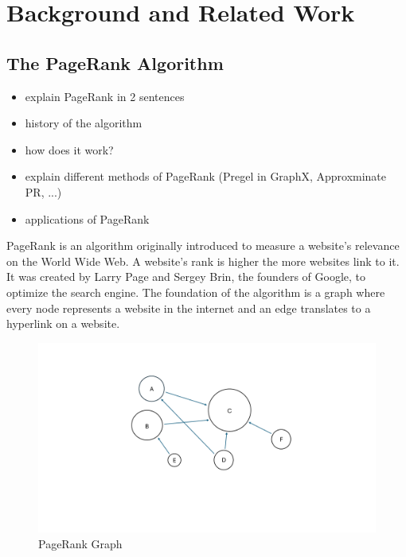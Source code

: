 
\section{Background and Related Work}
\subsection{The PageRank Algorithm}

\begin{itemize}
  \item explain PageRank in 2 sentences
  \item history of the algorithm
  \item how does it work? 
  \item explain different methods of PageRank (Pregel in GraphX, Approxminate PR, ...)
  \item applications of PageRank
\end{itemize}

PageRank is an algorithm originally introduced to measure a website's relevance on the World Wide Web. A website's rank is higher the more websites link to it. It was created by Larry Page and Sergey Brin, the founders of Google, to optimize the search engine.
The foundation of the algorithm is a graph where every node represents a website in the internet and an edge translates to a hyperlink on a website.
\begin{figure}[ht]
    \centering
    \includegraphics[width=0.7\linewidth]{images/PageRank Graph.pdf}
    \caption{PageRank Graph}
    \label{fig:pagerank-toy}
\end{figure}

